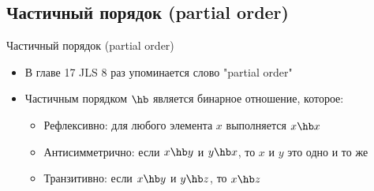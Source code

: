 \ifrender
\subsection{Частичный порядок (partial order)}
\begin{frame}{Частичный порядок (partial order)}
\begin{itemize}[<+->]
\item В главе 17 JLS 8 раз упоминается слово "partial order"
\item Частичным порядком $\hb$ является бинарное отношение, которое:
\begin{itemize}
\item Рефлексивно: для любого элемента $x$ выполняется $x \hb x$
\item Антисимметрично: если $x \hb y$ и $y \hb x$, то $x$ и $y$ это одно и то же
\item Транзитивно: если $x \hb y$ и $y \hb z$, то $x \hb z$
\end{itemize}
\end{itemize}
\end{frame}
\fi
